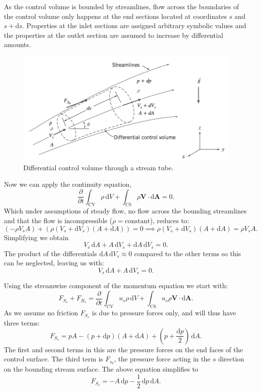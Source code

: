 As the control volume is bounded by streamlines, flow across the boundaries of the control volume only happens at the end sections located at coordinates $s$ and $s + \mathrm{d}s$. Properties at the inlet sections are assigned arbitrary symbolic values and the properties at the outlet section are assumed to increase by differential amounts. 

\begin{figure} [ht]
  \centering
  \includegraphics[width=0.5\linewidth]{./figures/f4_4.png}
  \caption{Differential control volume through a stream tube.}
  \label{fig:f4_4}
\end{figure}

Now we can apply the continuity equation,
\[ 
\frac{\partial }{\partial t} \int_{\mathrm{CV}} \rho \, \mathrm{d}V + \int_{\mathrm{CS}} \rho \textbf{V} \cdot \mathrm{d}\textbf{A} = 0
.\]
Which under assumptions of steady flow, no flow across the bounding streamlines and that the flow is incompressible ($\rho = \mathrm{constant}$), reduces to:
\[ 
\left( -\rho V_s A \right) + \left( \rho \left( V_s + \mathrm{d}V_s \right) \left( A + \mathrm{d}A \right) \right) = 0 \implies \rho \left( V_s + \mathrm{d}V_s \right) \left( A + \mathrm{d}A \right) = \rho V_s A
.\]
Simplifying we obtain
\[ 
V_s \, \mathrm{d}A + A \, \mathrm{d}V_s + \mathrm{d}A \, \mathrm{d}V_s = 0
.\]
The product of the differentials $\mathrm{d}A \, \mathrm{d}V_s \approx 0$ compared to the other terms so this can be neglected, leaving us with:
\[ 
V_s \, \mathrm{d}A + A \, \mathrm{d}V_s = 0
.\]

Using the streamwise component of the momentum equation we start with:
\[ 
F_{S_s} + F_{B_s} = \frac{\partial }{\partial t} \int_{\mathrm{CV}} u_s \rho \, \mathrm{d}V + \int_{\mathrm{CS}} u_s \rho \textbf{V} \cdot \mathrm{d}\textbf{A}
.\]
As we assume no friction $F_{S_s}$ is due to pressure forces only, and will thus have three terms:
\[ 
F_{S_s} = pA - \left( p + \mathrm{d}p \right)\left( A + \mathrm{d}A \right) + \left( p + \frac{\mathrm{d}p}{2} \right)\, \mathrm{d}A
.\]
The first and second terms in this are the pressure forces on the end faces of the control surface. The third term is $F_{s_b}$, the pressure force acting in the $s$ direction on the bounding stream surface. The above equation simplifies to
\[ 
F_{S_s} = - A \, \mathrm{d}p - \frac{1}{2} \, \mathrm{d}p \, \mathrm{d}A
.\]

